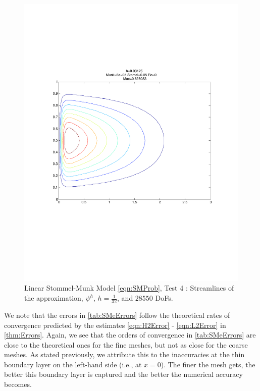 \begin{figure}[H]
  \begin{center}
    \includegraphics[trim=0 200 20 220, clip=true, scale=0.5]{StommelMunk2.pdf}
    \caption{Linear Stommel-Munk Model \eqref{eqn:SMProb}, Test 4 \cite{Cascon}: Streamlines of the approximation,
    $\psi^h$, $h=\frac{1}{32}$, and $28550$ DoFs.}
    \label{fig:SMe}
  \end{center}
\end{figure}

We note that the errors in \autoref{tab:SMeErrors} follow the theoretical rates of convergence
predicted by the estimates \eqref{eqn:H2Error} - \eqref{eqn:L2Error} in \autoref{thm:Errors}. Again,
we see that the orders of convergence in \autoref{tab:SMeErrors} are close to the theoretical ones
for the fine meshes, but not as close for the coarse meshes. As stated previously, we attribute this
to the inaccuracies at the thin boundary layer on the left-hand side (i.e., at $x=0$). The finer the
mesh gets, the better this boundary layer is captured and the better the numerical accuracy becomes.
 

